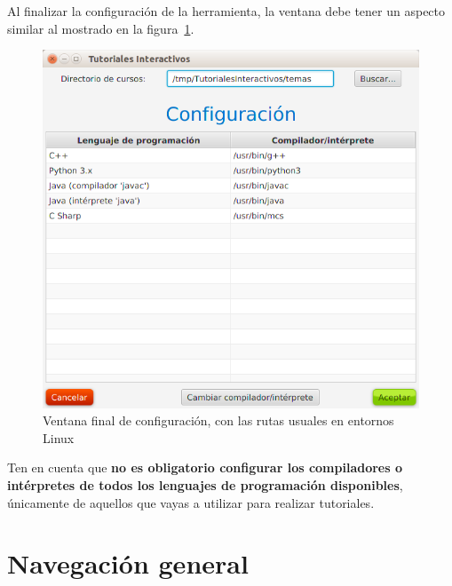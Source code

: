 \documentclass[]{article}
\begin{document}
Al finalizar la configuración de la herramienta, la ventana debe tener un aspecto similar al mostrado en la figura~\ref{fig:config3}.
%
\begin{figure}[tbp]
	\begin{center}
		\includegraphics[scale=0.4]{Configuracion_lenguajes_relleno.png}
	\end{center}
	\caption{Ventana final de configuración, con las rutas usuales en entornos Linux\label{fig:config3}}
\end{figure}
%
Ten en cuenta que \textbf{no es obligatorio configurar los compiladores o intérpretes de todos los lenguajes de programación disponibles}, únicamente de aquellos que vayas a utilizar para realizar tutoriales.

\section{Navegación general} %
\label{sec:ng}
\end{document}
